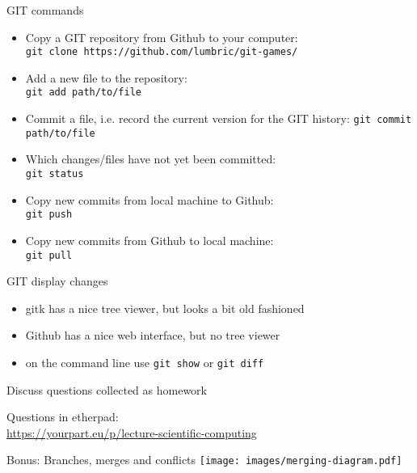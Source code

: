 \begin{frame}[fragile]{GIT commands}
    \begin{itemize}
        \item Copy a GIT repository from Github to your computer:\\
            \verb|git clone https://github.com/lumbric/git-games/|
        \item Add a new file to the repository:\\
            \verb|git add path/to/file|
        \item Commit a file, i.e. record the current version for the GIT history:
            \verb|git commit path/to/file|
        \item Which changes/files have not yet been committed:\\
            \verb|git status|
        \item Copy new commits from local machine to Github:\\
            \verb|git push|
        \item Copy new commits from Github to local machine:\\
            \verb|git pull|
    \end{itemize}
\end{frame}


\begin{frame}[fragile]{GIT display changes}
    \begin{itemize}
        \item gitk has a nice tree viewer, but looks a bit old fashioned
        \item Github has a nice web interface, but no tree viewer
        \item on the command line use \verb|git show| or \verb|git diff|
    \end{itemize}
\end{frame}


\begin{frame}[fragile]{Discuss questions collected as homework}

    Questions in etherpad:\\
    \href{https://yourpart.eu/p/lecture-scientific-computing}{https://yourpart.eu/p/lecture-scientific-computing}
\end{frame}


\begin{frame}[fragile]{Bonus: Branches, merges and conflicts}
    \texttt{[image: images/merging-diagram.pdf]}
\end{frame}

